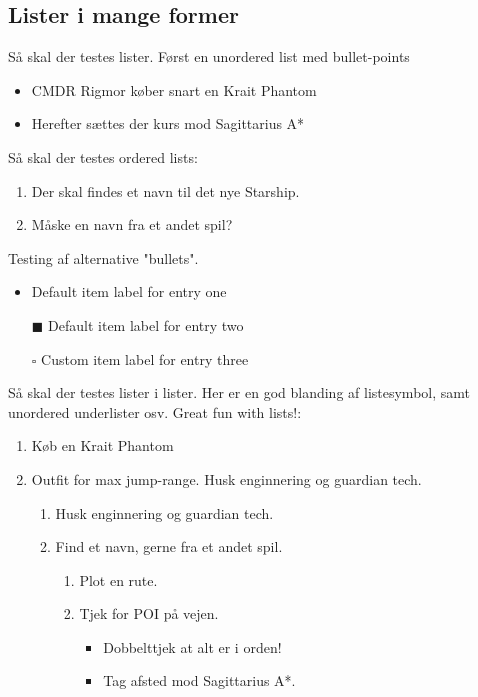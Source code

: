 \subsection{Lister i mange former}
Så skal der testes lister. Først en unordered list med bullet-points
\begin{itemize}
  \item CMDR Rigmor køber snart en Krait Phantom
  \item Herefter sættes der kurs mod Sagittarius A*
\end{itemize}

\vspace{1cm}
Så skal der testes ordered lists: 
\begin{enumerate}
  \item Der skal findes et navn til det nye Starship.
  \item Måske en navn fra et andet spil?
\end{enumerate}


\vspace{1cm}
Testing af alternative "bullets".
\begin{itemize}
 \item  Default item label for entry one
 \item[$\blacksquare$]  Default item label for entry two
 \item[$\square$]  Custom item label for entry three
\end{itemize}


\vspace{1cm}
Så skal der testes lister i lister. Her er en god blanding af listesymbol, samt unordered underlister osv. Great fun with lists!: 
 \renewcommand{\labelenumii}{\Roman{enumii}}
 \begin{enumerate}
   \item Køb en Krait Phantom
   \item Outfit for max jump-range. Husk enginnering og guardian tech.
   \begin{enumerate}
     \item Husk enginnering og guardian tech.
     \item Find et navn, gerne fra et andet spil.
     \begin{enumerate}
       \item Plot en rute.
       \item Tjek for POI på vejen.
       \begin{itemize}
         \item Dobbelttjek at alt er i orden!
         \item Tag afsted mod Sagittarius A*.
       \end{itemize}
     \end{enumerate}
 \end{enumerate}
 \end{enumerate}

